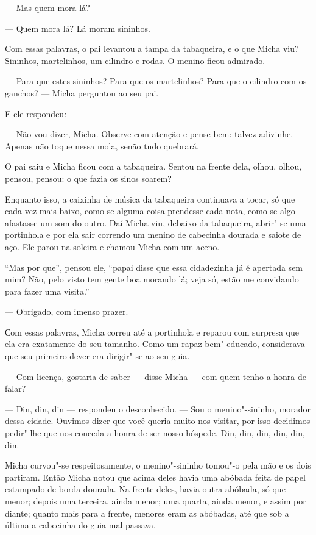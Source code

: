 --- Mas quem mora lá?

--- Quem mora lá? Lá moram sininhos.

Com essas palavras, o pai levantou a tampa da tabaqueira, e o que Micha
viu? Sininhos, martelinhos, um cilindro e rodas. O menino ficou admirado.

--- Para que estes sininhos? Para que os martelinhos? Para que o
cilindro com os ganchos? --- Micha perguntou ao seu pai.

E ele respondeu:

--- Não vou dizer, Micha. Observe com atenção e pense bem: talvez
adivinhe. Apenas não toque nessa mola, senão tudo quebrará.

O pai saiu e Micha ficou com a tabaqueira. Sentou na frente dela, olhou,
olhou, pensou, pensou: o que fazia os sinos soarem?

Enquanto isso, a caixinha de música da tabaqueira continuava a tocar, só
que cada vez mais baixo, como se alguma coisa prendesse cada nota, como
se algo afastasse um som do outro. Daí Micha viu, debaixo da tabaqueira,
abrir"-se uma portinhola e por ela sair correndo um menino de cabecinha
dourada e saiote de aço. Ele parou na soleira e chamou Micha com um
aceno.

``Mas por que'', pensou ele, ``papai disse que essa cidadezinha já é
apertada sem mim? Não, pelo visto tem gente boa morando lá; veja só,
estão me convidando para fazer uma visita.''

--- Obrigado, com imenso prazer.

Сom essas palavras, Micha correu até a portinhola e reparou com surpresa
que ela era exatamente do seu tamanho. Como um rapaz bem"-educado,
considerava que seu primeiro dever era dirigir"-se ao seu guia.

--- Com licença, gostaria de saber --- disse Micha --- com quem tenho a
honra de falar?

--- Din, din, din --- respondeu o desconhecido. --- Sou o
menino"-sininho, morador dessa cidade. Ouvimos dizer que você queria
muito nos visitar, por isso decidimos pedir"-lhe que nos conceda a honra
de ser nosso hóspede. Din, din, din, din, din, din.

Micha curvou"-se respeitosamente, o menino"-sininho tomou"-o pela mão e os
dois partiram. Então Micha notou que acima deles havia uma abóbada feita
de papel estampado de borda dourada. Na frente deles, havia outra
abóbada, só que menor; depois uma terceira, ainda menor; uma quarta,
ainda menor, e assim por diante; quanto mais para a frente, menores eram as
abóbadas, até que sob a última a cabecinha do guia mal passava.

